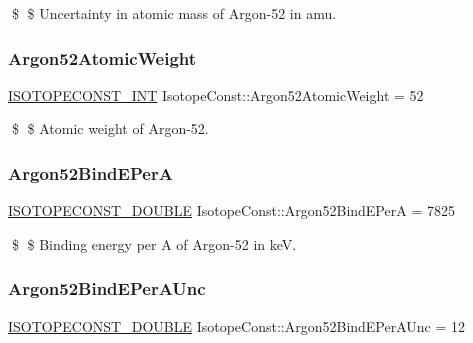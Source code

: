 \$ \$ Uncertainty in atomic mass of Argon-\/52 in amu. \mbox{\label{group___isotope_const-_argon-_ar52_ga8f47a3c1bd7634355743d4265b643d04}} 
\subsubsection{\texorpdfstring{Argon52\+Atomic\+Weight}{Argon52AtomicWeight}}
{\footnotesize\ttfamily \mbox{\hyperlink{group___isotope_const-_macros_ga5f18360b3e99483a35c32d789e62621c}{I\+S\+O\+T\+O\+P\+E\+C\+O\+N\+S\+T\+\_\+\+I\+NT}} Isotope\+Const\+::\+Argon52\+Atomic\+Weight = 52}

\$ \$ Atomic weight of Argon-\/52. \mbox{\label{group___isotope_const-_argon-_ar52_ga3526d89bd710d5689cb8f8e83ac3fbc6}} 
\subsubsection{\texorpdfstring{Argon52\+Bind\+E\+PerA}{Argon52BindEPerA}}
{\footnotesize\ttfamily \mbox{\hyperlink{group___isotope_const-_macros_ga8f45a7272ce02c0b4c65c44636ed719a}{I\+S\+O\+T\+O\+P\+E\+C\+O\+N\+S\+T\+\_\+\+D\+O\+U\+B\+LE}} Isotope\+Const\+::\+Argon52\+Bind\+E\+PerA = 7825}

\$ \$ Binding energy per A of Argon-\/52 in keV. \mbox{\label{group___isotope_const-_argon-_ar52_ga3011ff10ac898e1fd7fbf9a15c139038}} 
\subsubsection{\texorpdfstring{Argon52\+Bind\+E\+Per\+A\+Unc}{Argon52BindEPerAUnc}}
{\footnotesize\ttfamily \mbox{\hyperlink{group___isotope_const-_macros_ga8f45a7272ce02c0b4c65c44636ed719a}{I\+S\+O\+T\+O\+P\+E\+C\+O\+N\+S\+T\+\_\+\+D\+O\+U\+B\+LE}} Isotope\+Const\+::\+Argon52\+Bind\+E\+Per\+A\+Unc = 12}

